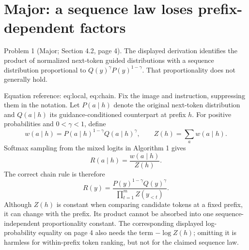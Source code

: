 \documentclass[10pt]{article}
\begin{document}
\section*{Major: a sequence law loses prefix-dependent factors}
Problem 1 (Major; Section 4.2, page 4).  The displayed derivation identifies the product of normalized next-token guided distributions with a sequence distribution proportional to \(Q(y)^\gamma P(y)^{1-\gamma}\). That proportionality does not generally hold.\par
Equation reference: eq:local, eq:chain. Fix the image and instruction, suppressing them in the notation. Let \(P(a\mid h)\) denote the original next-token distribution and \(Q(a\mid h)\) its guidance-conditioned counterpart at prefix \(h\). For positive probabilities and \(0<\gamma<1\), define \[w(a\mid h)=P(a\mid h)^{1-\gamma}Q(a\mid h)^\gamma,\qquad
 Z(h)=\sum_a w(a\mid h).\] Softmax sampling from the mixed logits in Algorithm 1 gives \[
 R(a\mid h)=\frac{w(a\mid h)}{Z(h)}.\] The correct chain rule is therefore \[
 R(y)=\frac{P(y)^{1-\gamma}Q(y)^\gamma}
              {\prod_{t=1}^{m} Z(y_{<t})}.\] Although \(Z(h)\) is constant when comparing candidate tokens at a fixed prefix, it can change with the prefix. Its product cannot be absorbed into one sequence-independent proportionality constant. The corresponding displayed log-probability equality on page 4 also needs the term \(-\log Z(h)\); omitting it is harmless for within-prefix token ranking, but not for the claimed sequence law.\par
\end{document}
